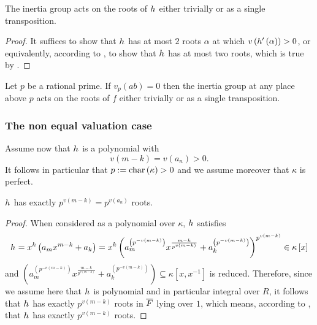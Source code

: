 \documentclass[../main.tex]{subfiles}
\begin{document}
  \begin{corollary}
    \label{cor:inertia_group_acts_as_transposition}
    The inertia group acts on the roots of $h_{}$ either trivially or as a single transposition.
  \end{corollary}
  \begin{proof}
    It suffices to show that $h_{}$ has at most $2$ roots $\alpha$ at which $v\left( h_{}'\left( \alpha \right) \right) > 0$, or equivalently, according to , to show that $h_{}$ has at most two \ex roots, which is true by . 
  \end{proof}
  \begin{corollary}
    \label{cor:inertia_group_acts_as_transposition_external_settings}
    Let $p$ be a rational prime.
    If $v_p\left( ab \right) = 0$ then the inertia group at any place above $p$ acts on the roots of $f$ either trivially or as a single transposition.
  \end{corollary}
\subsubsection{The non equal valuation case}
  Assume now that $h_{}$ is a \redex polynomial with    
  \[
    v\left( m - k \right) = v\left( a_n \right) > 0.
  \]
  It follows in particular that $p := {\rm char}\left( \kappa \right) > 0$ and we assume moreover that $\kappa$ is perfect.
  \begin{lemma}
    \label{lem:counting_ex_roots}
    $h_{}$ has exactly $p^{v\left( m - k \right)} = p^{v\left( a_n \right)}$ \ex roots.
  \end{lemma}
  \begin{proof}
    When considered as a polynomial over $\kappa$, $h_{}$ satisfies 
    \[
      h_{} 
      = 
      x^k \left( 
        a_m x^{m - k} + a_k 
      \right) 
      =
      x^k \left(  
        a_m^{\left( p^{-v\left( m - k \right)} \right)} x^{\frac{m - k}{p^{v\left( m - k \right)}}} + a_k^{\left( p^{-v\left( m - k \right)} \right)}
      \right)^{p^{v\left( m - k \right)}}
      \in \kappa\left[ x \right]
    \]
    and $\left( a_m^{\left( p^{-v\left( m - k \right)} \right)} x^{\frac{m - k}{p^{v\left( m - k \right)}}} + a_k^{\left( p^{-v\left( m - k \right)} \right)} \right) \subseteq \kappa\left[ x, x^{-1} \right]$ is reduced.
    Therefore, since we assume here that $h_{}$ is \aredex polynomial and in particular integral over $R$, it follows that $h_{}$ has exactly $p^{v\left( m - k \right)}$ roots in $\overline{F}$ lying over $1$, which means, according to , that $h_{}$ has exactly $p^{v\left( m - k \right)}$ \ex roots.
  \end{proof}
\end{document}
